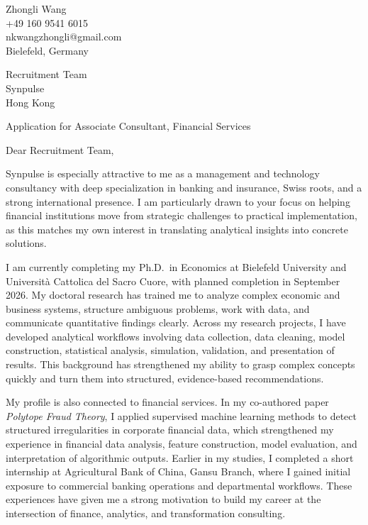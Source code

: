 \documentclass[11pt]{article}
\begin{document}
\begin{flushright}
Zhongli Wang \\
+49 160 9541 6015 \\
nkwangzhongli@gmail.com \\
Bielefeld, Germany \\
\end{flushright}

\vspace{0.1cm}

\noindent
Recruitment Team \\
Synpulse \\
Hong Kong \\

\vspace{0.1cm}

\noindent
Application for Associate Consultant, Financial Services \\

\vspace{0.05cm}

\noindent Dear Recruitment Team,

Synpulse is especially attractive to me as a management and technology consultancy with deep specialization in banking and insurance, Swiss roots, and a strong international presence. I am particularly drawn to your focus on helping financial institutions move from strategic challenges to practical implementation, as this matches my own interest in translating analytical insights into concrete solutions.

I am currently completing my Ph.D.\ in Economics at Bielefeld University and Universit\`a Cattolica del Sacro Cuore, with planned completion in September 2026. My doctoral research has trained me to analyze complex economic and business systems, structure ambiguous problems, work with data, and communicate quantitative findings clearly. Across my research projects, I have developed analytical workflows involving data collection, data cleaning, model construction, statistical analysis, simulation, validation, and presentation of results. This background has strengthened my ability to grasp complex concepts quickly and turn them into structured, evidence-based recommendations.

My profile is also connected to financial services. In my co-authored paper \emph{Polytope Fraud Theory}, I applied supervised machine learning methods to detect structured irregularities in corporate financial data, which strengthened my experience in financial data analysis, feature construction, model evaluation, and interpretation of algorithmic outputs. Earlier in my studies, I completed a short internship at Agricultural Bank of China, Gansu Branch, where I gained initial exposure to commercial banking operations and departmental workflows. These experiences have given me a strong motivation to build my career at the intersection of finance, analytics, and transformation consulting.
\end{document}
